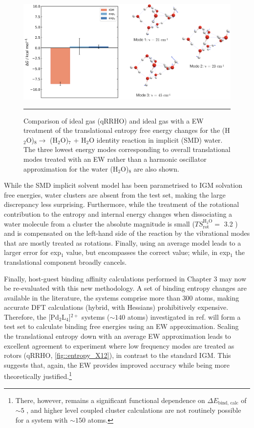\documentclass[../main.tex]{subfiles}
\begin{document}
\begin{figure}[h!]
	\centering
	\includegraphics[width=15cm]{4/figs/figX11/figX11}
	\vspace{0.2cm}
	\hrule
	\caption{Comparison of ideal gas (qRRHO) and ideal gas with a EW treatment of the translational entropy free energy changes for the (H$_2$O)$_8 \longrightarrow$ (H$_2$O)$_7$ +  H$_2$O identity reaction in implicit (SMD) water. The three lowest energy modes corresponding to overall translational modes treated with an EW rather than a harmonic oscillator approximation for the water (H$_2$O)$_8$ are also shown.} 
	\label{fig::entropy_X11}
\end{figure}

While the SMD implicit solvent model has been parametrised to IGM solvation free energies, water clusters are absent from the test set,\cite{Marenich2009} making the large discrepancy less surprising. Furthermore, while the treatment of the rotational contribution to the entropy and internal energy changes when dissociating a water molecule from a cluster the absolute magnitude is small ($TS_\text{rot}^{\text{H}{}_2\text{O}} =$ 3.2 \kcal) and is compensated on the left-hand side of the reaction by the vibrational modes that are mostly treated as rotations. Finally, using an average model leads to a larger error for exp$_1$ value, but encompasses the correct value; while, in exp$_1$ the translational component broadly cancels.

\newpage
Finally, host-guest binding affinity calculations performed in Chapter 3 may now be re-evaluated with this new methodology.  A set of binding entropy changes are available in the literature,\cite{Leung2008} the systems comprise more than 300 atoms, making accurate DFT calculations (hybrid, with Hessians) prohibitively expensive. Therefore, the [Pd$_2$L$_4$]${}^{2+}$ systems ($\sim140$ atoms) investigated in ref. \cite{Young2019} will form a test set to calculate binding free energies using an EW approximation. Scaling the translational entropy down with an average EW approximation leads to excellent agreement to experiment where low frequency modes are treated as rotors (qRRHO, \figurename{ \ref{fig::entropy_X12}}), in contrast to the standard IGM. This suggests that, again, the EW provides improved accuracy while being more theoretically justified.\footnote{There, however, remains a significant functional dependence on $\Delta E_\text{bind, calc}$ of $\sim 5$ \kcal, and higher level coupled cluster calculations are not routinely possible for a system with $\sim 150$ atoms.}
\end{document}
